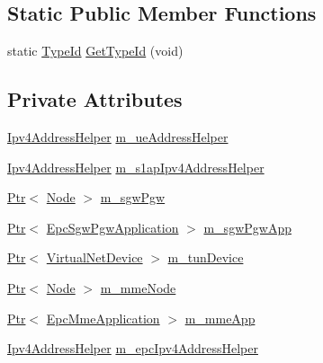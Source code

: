 \subsection*{Static Public Member Functions}
\begin{DoxyCompactItemize}
\item 
static \hyperlink{classns3_1_1TypeId}{Type\+Id} \hyperlink{classns3_1_1EmuEpcHelper_ac8293232dc3c4e65ef35373424ea75b2}{Get\+Type\+Id} (void)
\end{DoxyCompactItemize}
\subsection*{Private Attributes}
\begin{DoxyCompactItemize}
\item 
\hyperlink{classns3_1_1Ipv4AddressHelper}{Ipv4\+Address\+Helper} \hyperlink{classns3_1_1EmuEpcHelper_ab57fc887c64c3f3aec6516957a84275d}{m\+\_\+ue\+Address\+Helper}
\item 
\hyperlink{classns3_1_1Ipv4AddressHelper}{Ipv4\+Address\+Helper} \hyperlink{classns3_1_1EmuEpcHelper_af71f1e0e4c76588bf8c7565484614c08}{m\+\_\+s1ap\+Ipv4\+Address\+Helper}
\item 
\hyperlink{classns3_1_1Ptr}{Ptr}$<$ \hyperlink{classns3_1_1Node}{Node} $>$ \hyperlink{classns3_1_1EmuEpcHelper_a5c68f673b82b8c80b5fb88ae986f8cea}{m\+\_\+sgw\+Pgw}
\item 
\hyperlink{classns3_1_1Ptr}{Ptr}$<$ \hyperlink{classns3_1_1EpcSgwPgwApplication}{Epc\+Sgw\+Pgw\+Application} $>$ \hyperlink{classns3_1_1EmuEpcHelper_a9f3619ec9e8725d4fbb9794a4f21aaa4}{m\+\_\+sgw\+Pgw\+App}
\item 
\hyperlink{classns3_1_1Ptr}{Ptr}$<$ \hyperlink{classns3_1_1VirtualNetDevice}{Virtual\+Net\+Device} $>$ \hyperlink{classns3_1_1EmuEpcHelper_ababd4c0bb2cb44e0194c852e6411b501}{m\+\_\+tun\+Device}
\item 
\hyperlink{classns3_1_1Ptr}{Ptr}$<$ \hyperlink{classns3_1_1Node}{Node} $>$ \hyperlink{classns3_1_1EmuEpcHelper_aef136870f0ad1c40d3e139f34ff9f5d1}{m\+\_\+mme\+Node}
\item 
\hyperlink{classns3_1_1Ptr}{Ptr}$<$ \hyperlink{classns3_1_1EpcMmeApplication}{Epc\+Mme\+Application} $>$ \hyperlink{classns3_1_1EmuEpcHelper_a20264a8bd8b295161b08d09e4794f02f}{m\+\_\+mme\+App}
\item 
\hyperlink{classns3_1_1Ipv4AddressHelper}{Ipv4\+Address\+Helper} \hyperlink{classns3_1_1EmuEpcHelper_a53dccacd37ee9a31fbd739762a615c1b}{m\+\_\+epc\+Ipv4\+Address\+Helper}
\item 

\end{DoxyCompactItemize}
